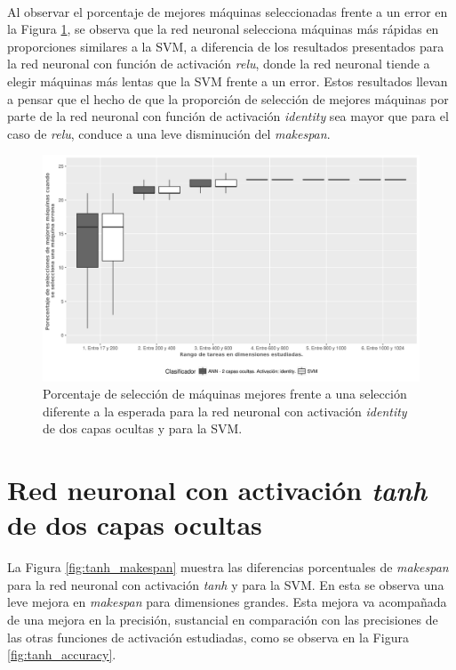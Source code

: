 \paragraph{}Al observar el porcentaje de mejores máquinas seleccionadas frente a un error en la Figura \ref{fig:identity_mejores}, se observa que la red neuronal selecciona máquinas más rápidas en proporciones similares a la SVM, a diferencia de los resultados presentados para la red neuronal con función de activación \textit{relu}, donde la red neuronal tiende a elegir máquinas más lentas que la SVM frente a un error. Estos resultados llevan a pensar que el hecho de que la proporción de selección de mejores máquinas por parte de la red neuronal con función de activación \textit{identity} sea mayor que para el caso de \textit{relu}, conduce a una leve disminución del \textit{makespan}. 

\begin{figure}[H]
  \centering
  \includegraphics[width=\columnwidth]{imagenes/identity/4_porcentaje_maquinas_mejores_ann_2_capas_ocultas_identity.png}
  \caption{Porcentaje de selección de máquinas mejores frente a una selección diferente a la esperada para la red neuronal con activación \textit{identity} de dos capas ocultas y para la SVM.}
  \label{fig:identity_mejores}
\end{figure}

\section{Red neuronal con activación \textit{tanh} de dos capas ocultas}

La Figura \ref{fig:tanh_makespan} muestra las diferencias porcentuales de \textit{makespan} para la red neuronal con activación \textit{tanh} y para la SVM. En esta se observa una leve mejora en \textit{makespan} para dimensiones grandes. Esta mejora va acompañada de una mejora en la precisión, sustancial en comparación con las precisiones de las otras funciones de activación estudiadas, como se observa en la Figura \ref{fig:tanh_accuracy}.  

